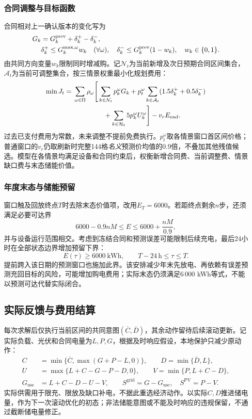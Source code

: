 \subsubsection{合同调整与目标函数}
合同相对上一确认版本的变化写为
\begin{align}
 G_k&=G_k^{\mathrm{prev}}+\delta_k^+-\delta_k^-,\notag\\
 &\delta_k^+\le G_k^{\max,\omega}w_k\quad(\forall\omega),\quad
 \delta_k^-\le G_k^{\mathrm{prev}}(1-w_k),\quad w_k\in\{0,1\}.
\end{align}
由共同方向变量$w_k$限制同时增减购。记$\mathcal N_t$为当前新增及次日预期合同区间集合，$\mathcal A_t$为当前可调整集合，按三情景权重最小化规划费用：
\begin{align}
 \min J_t={}&\sum_{\omega\in\Omega}\rho_\omega\Bigg[
 \sum_{k\in\mathcal N_t}p_k^\omega G_k
 +p_t^\omega\sum_{k\in\mathcal A_t}(1.5\delta_k^++0.5\delta_k^-)\notag\\
 &\hspace{4.5em}+\sum_{k\in\mathcal H_t}5p_k^\omega U_k^\omega\Bigg]
 -v_rE_{\mathrm{end}}.
 \label{eq:q4-scenario-objective}
\end{align}
过去已支付费用为常数，未来调整不提前免费执行。$p_t^\omega$取各情景窗口首区间价格；普通窗口的$v_r$仍取刷新时完整144格\emph{名义}预测价均值的0.9倍，不叠加其他残值候选。模型在各情景均满足设备和合同约束后，权衡新增合同费、当前调整费、情景缺口费与末态储能价值。

\subsubsection{年度末态与储能预留}
窗口触及回放终点$T$时去除末态价值项，改用$E_T=6000$。若距终点剩余$n$步，还须满足必要可达界
\begin{equation}
 6000-0.9nM\le E\le6000+\frac{nM}{0.9},
\end{equation}
并与设备运行范围相交。考虑到冻结合同和预测误差可能限制后续充电，最后24小时在全部状态边界增加预留下界：
\begin{equation}
 E(\tau)\ge6000\ \mathrm{kWh},\qquad T-24\,\mathrm h\le\tau\le T.
\end{equation}
提前跨入该日期的预测窗口也施加此界。该安排减少年末先放电、再依赖有误差预测充回目标的风险，可能增加购电费用；实际末态仍须满足6\,000 kWh等式，不能以预测可达代替实际闭合。

\subsection{实际反馈与费用结算}
每次求解后仅执行当前区间的共同意图$(\overline C,\overline D)$，其余动作留待后续滚动更新。记实际负载、光伏和合同电量为$L,P,G$，根据及时响应假设，本地保护只减少原动作：
\begin{align}
 C&=\min\{\overline C,\max(G+P-L,0)\},\qquad D=\min\{\overline D,L\},\\
 U&=\max\{L+C-G-P-D,0\},\qquad V=\min\{P,L+C-D\},\\
 G_{\mathrm{use}}&=L+C-D-U-V,\qquad
 S^{\mathrm{grid}}=G-G_{\mathrm{use}},\quad S^{\mathrm{PV}}=P-V.
\end{align}
实际供需用于限充、限放及缺口补电，不据此重选经济动作。以实际$C,D$推进储电量，作为下一次滚动优化的初态；非法储能意图或不能及时响应的违规保留，不通过截断储电量修正。

